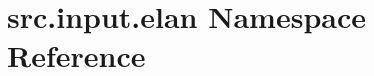 \hypertarget{namespacesrc_1_1input_1_1elan}{\section{src.\+input.\+elan Namespace Reference}
\label{namespacesrc_1_1input_1_1elan}
}
